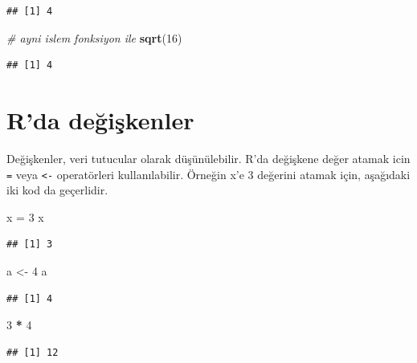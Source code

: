 \documentclass[
]{book}
\newenvironment{Shaded}{\begin{snugshade}}{\end{snugshade}}
\newcommand{\CommentTok}[1]{\textcolor[rgb]{0.56,0.35,0.01}{\textit{#1}}}
\newcommand{\DecValTok}[1]{\textcolor[rgb]{0.00,0.00,0.81}{#1}}
\newcommand{\KeywordTok}[1]{\textcolor[rgb]{0.13,0.29,0.53}{\textbf{#1}}}
\newcommand{\NormalTok}[1]{#1}
\newcommand{\OperatorTok}[1]{\textcolor[rgb]{0.81,0.36,0.00}{\textbf{#1}}}
\newcommand{\StringTok}[1]{\textcolor[rgb]{0.31,0.60,0.02}{#1}}
\begin{document}
\begin{verbatim}
## [1] 4
\end{verbatim}

\begin{Shaded}
\begin{Highlighting}[]
\CommentTok{\# ayni islem fonksiyon ile}
\KeywordTok{sqrt}\NormalTok{(}\DecValTok{16}\NormalTok{) }
\end{Highlighting}
\end{Shaded}

\begin{verbatim}
## [1] 4
\end{verbatim}

\hypertarget{rda-deux11fiux15fkenler}{%
\section{R'da değişkenler}\label{rda-deux11fiux15fkenler}}

Değişkenler, veri tutucular olarak düşünülebilir. R'da değişkene değer atamak icin \texttt{=} veya \texttt{\textless{}-} operatörleri kullanılabilir. Örneğin x'e 3 değerini atamak için, aşağıdaki iki kod da geçerlidir.

\begin{Shaded}
\begin{Highlighting}[]
\NormalTok{x =}\StringTok{ }\DecValTok{3}
\NormalTok{x}
\end{Highlighting}
\end{Shaded}

\begin{verbatim}
## [1] 3
\end{verbatim}

\begin{Shaded}
\begin{Highlighting}[]
\NormalTok{a <{-}}\StringTok{ }\DecValTok{4}
\NormalTok{a}
\end{Highlighting}
\end{Shaded}

\begin{verbatim}
## [1] 4
\end{verbatim}

\begin{Shaded}
\begin{Highlighting}[]
\DecValTok{3} \OperatorTok{*}\StringTok{ }\DecValTok{4}
\end{Highlighting}
\end{Shaded}

\begin{verbatim}
## [1] 12
\end{verbatim}
\end{document}
